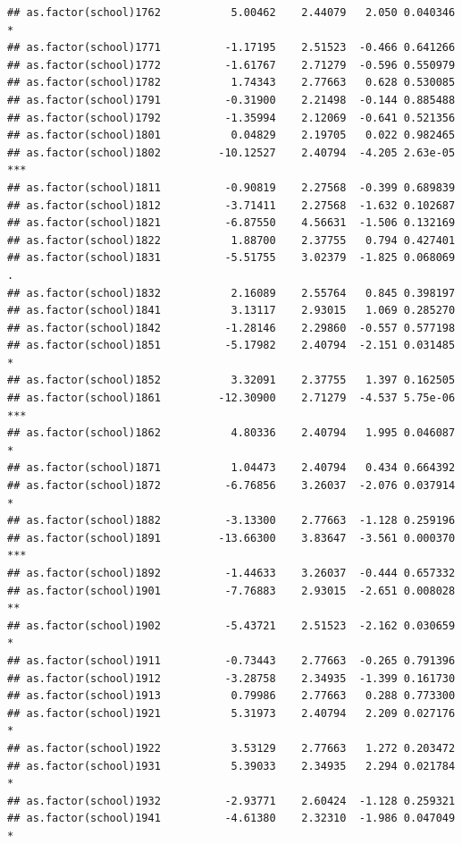 \documentclass[ignorenonframetext,]{beamer}
\begin{document}
\begin{frame}[fragile]{}
\begin{verbatim}
## as.factor(school)1762           5.00462    2.44079   2.050 0.040346 *  
## as.factor(school)1771          -1.17195    2.51523  -0.466 0.641266    
## as.factor(school)1772          -1.61767    2.71279  -0.596 0.550979    
## as.factor(school)1782           1.74343    2.77663   0.628 0.530085    
## as.factor(school)1791          -0.31900    2.21498  -0.144 0.885488    
## as.factor(school)1792          -1.35994    2.12069  -0.641 0.521356    
## as.factor(school)1801           0.04829    2.19705   0.022 0.982465    
## as.factor(school)1802         -10.12527    2.40794  -4.205 2.63e-05 ***
## as.factor(school)1811          -0.90819    2.27568  -0.399 0.689839    
## as.factor(school)1812          -3.71411    2.27568  -1.632 0.102687    
## as.factor(school)1821          -6.87550    4.56631  -1.506 0.132169    
## as.factor(school)1822           1.88700    2.37755   0.794 0.427401    
## as.factor(school)1831          -5.51755    3.02379  -1.825 0.068069 .  
## as.factor(school)1832           2.16089    2.55764   0.845 0.398197    
## as.factor(school)1841           3.13117    2.93015   1.069 0.285270    
## as.factor(school)1842          -1.28146    2.29860  -0.557 0.577198    
## as.factor(school)1851          -5.17982    2.40794  -2.151 0.031485 *  
## as.factor(school)1852           3.32091    2.37755   1.397 0.162505    
## as.factor(school)1861         -12.30900    2.71279  -4.537 5.75e-06 ***
## as.factor(school)1862           4.80336    2.40794   1.995 0.046087 *  
## as.factor(school)1871           1.04473    2.40794   0.434 0.664392    
## as.factor(school)1872          -6.76856    3.26037  -2.076 0.037914 *  
## as.factor(school)1882          -3.13300    2.77663  -1.128 0.259196    
## as.factor(school)1891         -13.66300    3.83647  -3.561 0.000370 ***
## as.factor(school)1892          -1.44633    3.26037  -0.444 0.657332    
## as.factor(school)1901          -7.76883    2.93015  -2.651 0.008028 ** 
## as.factor(school)1902          -5.43721    2.51523  -2.162 0.030659 *  
## as.factor(school)1911          -0.73443    2.77663  -0.265 0.791396    
## as.factor(school)1912          -3.28758    2.34935  -1.399 0.161730    
## as.factor(school)1913           0.79986    2.77663   0.288 0.773300    
## as.factor(school)1921           5.31973    2.40794   2.209 0.027176 *  
## as.factor(school)1922           3.53129    2.77663   1.272 0.203472    
## as.factor(school)1931           5.39033    2.34935   2.294 0.021784 *  
## as.factor(school)1932          -2.93771    2.60424  -1.128 0.259321    
## as.factor(school)1941          -4.61380    2.32310  -1.986 0.047049 *  

\end{verbatim}
\end{frame}
\end{document}
